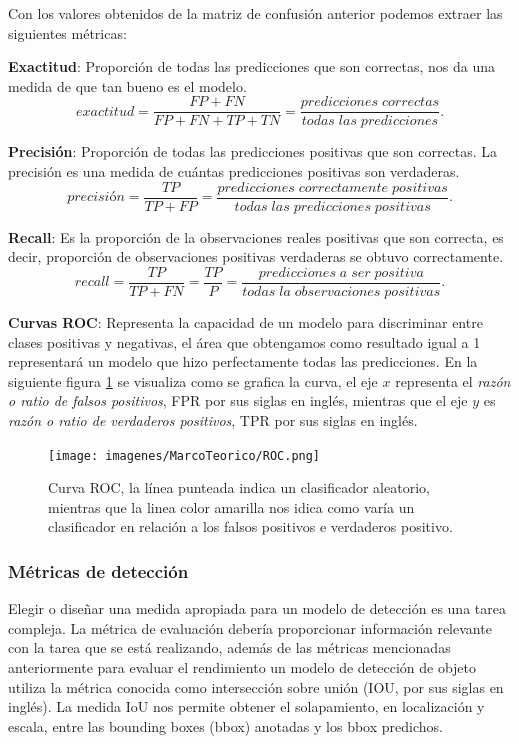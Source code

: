 Con los valores obtenidos de la matriz de confusión anterior podemos extraer las siguientes métricas:

\textbf{Exactitud}: Proporción de todas las predicciones que son correctas, nos da una medida de que tan bueno es el modelo.
\begin{equation}
exactitud = \frac{FP+FN}{FP+FN+TP+TN}=\frac{predicciones\;correctas}{todas\;las\;predicciones}.
\end{equation}

\textbf{Precisión}: Proporción de todas las predicciones positivas que son correctas. La precisión es una medida de cuántas predicciones positivas son verdaderas.
\begin{equation}
precisión=\frac{TP}{TP+FP}= \frac{predicciones\;correctamente\;positivas}{todas\;las\;predicciones\;positivas}.
\end{equation}

\textbf{Recall}: Es la proporción de la observaciones reales positivas que son correcta, es decir, proporción de observaciones positivas verdaderas se obtuvo correctamente.
\begin{equation}
recall = \frac{TP}{TP+FN} = \frac{TP}{P} = \frac{predicciones\;a\;ser\;positiva}{todas\;la\;observaciones\;positivas} .
\end{equation}

\textbf{Curvas ROC}: Representa la capacidad de un modelo para discriminar entre clases positivas y negativas, el área que obtengamos  como resultado igual a 1 representará un modelo que hizo perfectamente todas las predicciones. En la siguiente figura \ref{Fig: roc} se visualiza como se grafica la curva, el eje $x$ representa el \textit{razón o ratio de falsos positivos}, FPR por sus siglas en inglés, mientras que el eje $y$ es \textit{razón o ratio de verdaderos positivos}, TPR por sus siglas en inglés.

\begin{figure}[H]
 \centering
  \texttt{[image: imagenes/MarcoTeorico/ROC.png]}
  \caption{Curva ROC, la línea punteada indica un clasificador aleatorio, mientras que la linea color amarilla nos idica como varía un clasificador en relación a los falsos positivos e verdaderos positivo.} \label{Fig: roc}
\end{figure}

\subsubsection*{Métricas de detección}\label{sub:metricas_de_deteccion}
Elegir o diseñar una medida apropiada para un modelo de detección es una tarea compleja. La métrica de evaluación debería proporcionar información relevante con la tarea que se está realizando, además de las métricas mencionadas anteriormente para evaluar el rendimiento un modelo de detección de objeto utiliza la métrica conocida como intersección sobre unión (IOU, por sus siglas en inglés). La medida IoU nos permite obtener el solapamiento, en localización y escala, entre las bounding boxes (bbox) anotadas y los bbox	 predichos.

